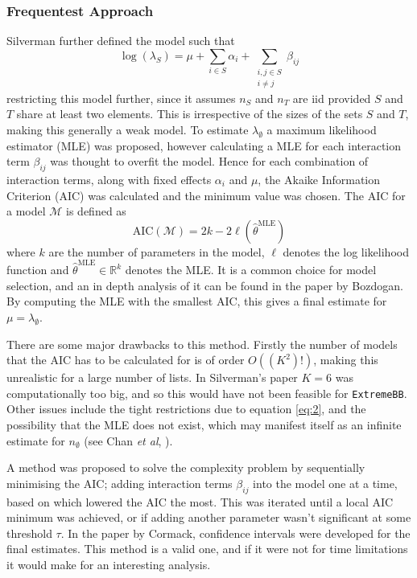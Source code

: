 \documentclass[10pt,a4paper,notitlepage]{article}
\newcommand{\R}{\mathbb{R}}
\begin{document}
\subsubsection*{Frequentest Approach}
Silverman further defined the model such that
\begin{equation}\label{eq:2}
\log(\lambda_{S})=\mu +\sum_{i\in S}\alpha_{i}+\sum_{\substack{i,j\in S\\i\neq j}}\beta_{ij}
\end{equation}
restricting this model further, since it assumes $n_{S}$ and $n_{T}$ are iid provided $S$ and $T$ share at least two elements. This is irrespective of the sizes of the sets $S$ and $T$, making this generally a weak model. To estimate $\lambda_{\emptyset}$ a maximum likelihood estimator (MLE) was proposed, however calculating a MLE for each interaction term $\beta_{ij}$ was thought to overfit the model. Hence for each combination of interaction terms, along with fixed effects $\alpha_{i}$ and $\mu$, the Akaike Information Criterion (AIC) was calculated and the minimum value was chosen. The AIC for a model $\mathcal{M}$ is defined as
\begin{equation}
\text{AIC}(\mathcal{M})=2k -2 \ell(\hat{\theta}^{\text{MLE}})
\end{equation}
where $k$ are the number of parameters in the model, $\ell$ denotes the log likelihood function and $\hat{\theta}^{\text{MLE}}\in \R^{k}$ denotes the MLE. It is a common choice for model selection, and an in depth analysis of it can be found in the paper \cite{AIC} by Bozdogan. By computing the MLE with the smallest AIC, this gives a final estimate for $\mu=\lambda_{\emptyset}$. 

There are some major drawbacks to this method. Firstly the number of models that the AIC has to be calculated for is of order $O((K^{2})!)$, making this unrealistic for a large number of lists. In Silverman's paper $K=6$ was computationally too big, and so this would have not been feasible for \texttt{ExtremeBB}. Other issues include the tight restrictions due to equation \eqref{eq:2}, and the possibility that the MLE does not exist, which may manifest itself as an infinite estimate for $n_{\emptyset}$ (see Chan \textit{et al}, \cite{Chan}). 

A method was proposed to solve the complexity problem by sequentially minimising the AIC; adding interaction terms $\beta_{ij}$ into the model one at a time, based on which lowered the AIC the most. This was iterated until a local AIC minimum was achieved, or if adding another parameter wasn't significant at some threshold $\tau$. In the paper \cite{Cormack} by Cormack, confidence intervals were developed for the final estimates. This method is a valid one, and if it were not for time limitations it would make for an interesting analysis.
\end{document}
